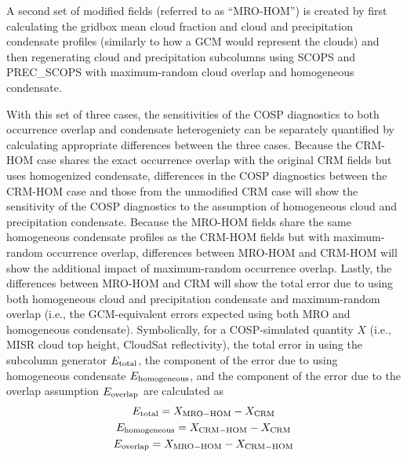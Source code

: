 A second set of modified fields (referred to as ``MRO-HOM'') is created by first calculating the gridbox mean cloud fraction and cloud and precipitation condensate profiles (similarly to how a GCM would represent the clouds) and then regenerating cloud and precipitation subcolumns using SCOPS and PREC\_SCOPS with maximum-random cloud overlap and homogeneous condensate.

With this set of three cases, the sensitivities of the COSP diagnostics to both occurrence overlap and condensate heterogeniety can be separately quantified by calculating appropriate differences between the three cases. Because the CRM-HOM case shares the exact occurrence overlap with the original CRM fields but uses homogenized condensate, differences in the COSP diagnostics between the CRM-HOM case and those from the unmodified CRM case will show the sensitivity of the COSP diagnostics to the assumption of homogeneous cloud and precipitation condensate. Because the MRO-HOM fields share the same homogeneous condensate profiles as the CRM-HOM fields but with maximum-random occurrence overlap, differences between MRO-HOM and CRM-HOM will show the additional impact of maximum-random occurrence overlap. Lastly, the differences between MRO-HOM and CRM will show the total error due to using both homogeneous cloud and precipitation condensate and maximum-random overlap (i.e., the GCM-equivalent errors expected using both MRO and homogeneous condensate). Symbolically, for a COSP-simulated quantity $X$ (i.e., MISR cloud top height, CloudSat reflectivity), the total error in using the subcolumn generator $E_{\rm total}$, the component of the error due to using homogeneous condensate $E_{\rm homogeneous}$, and the component of the error due to the overlap assumption $E_{\rm overlap}$ are calculated as
\begin{gather}
    E_{\rm total} = X_{\rm MRO-HOM} - X_{\rm CRM} \\
    E_{\rm homogeneous} = X_{\rm CRM-HOM} - X_{\rm CRM} \\
    E_{\rm overlap} = X_{\rm MRO-HOM} - X_{\rm CRM-HOM}
\end{gather}

